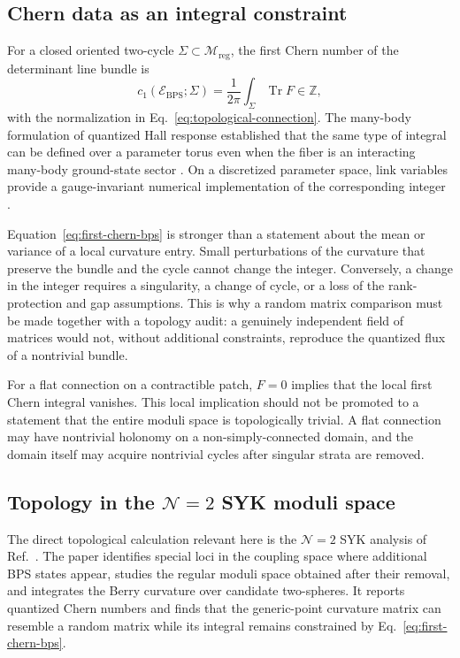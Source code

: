 \subsection{Chern data as an integral constraint}

For a closed oriented two-cycle $\Sigma\subset\mathcal{M}_{\mathrm{reg}}$, the
first Chern number of the determinant line bundle is
\begin{equation}
 c_1(\mathcal{E}_{\mathrm{BPS}};\Sigma)
 =\frac{1}{2\pi}\int_{\Sigma}\operatorname{Tr}F\in\mathbb{Z},
 \label{eq:first-chern-bps}
\end{equation}
with the normalization in Eq.~\eqref{eq:topological-connection}.  The
many-body formulation of quantized Hall response established that the same
type of integral can be defined over a parameter torus even when the fiber is
an interacting many-body ground-state sector
\cite{niu1985}.  On a discretized parameter space, link variables
provide a gauge-invariant numerical implementation of the corresponding
integer \cite{fukui2005}.

Equation~\eqref{eq:first-chern-bps} is stronger than a statement about the
mean or variance of a local curvature entry.  Small perturbations of the
curvature that preserve the bundle and the cycle cannot change the integer.
Conversely, a change in the integer requires a singularity, a change of cycle,
or a loss of the rank-protection and gap assumptions.  This is why a random
matrix comparison must be made together with a topology audit: a genuinely
independent field of matrices would not, without additional constraints,
reproduce the quantized flux of a nontrivial bundle.

For a flat connection on a contractible patch, $F=0$ implies that the local
first Chern integral vanishes.  This local implication should not be promoted
to a statement that the entire moduli space is topologically trivial.  A flat
connection may have nontrivial holonomy on a non-simply-connected domain, and
the domain itself may acquire nontrivial cycles after singular strata are
removed.

\subsection{Topology in the \texorpdfstring{$\mathcal{N}=2$}{N=2} SYK moduli space}

The direct topological calculation relevant here is the $\mathcal{N}=2$ SYK
analysis of Ref.~\cite{chen2026berry}.  The paper identifies special loci in
the coupling space where additional BPS states appear, studies the regular
moduli space obtained after their removal, and integrates the Berry curvature
over candidate two-spheres.  It reports quantized Chern numbers and finds that
the generic-point curvature matrix can resemble a random matrix while its
integral remains constrained by Eq.~\eqref{eq:first-chern-bps}.


